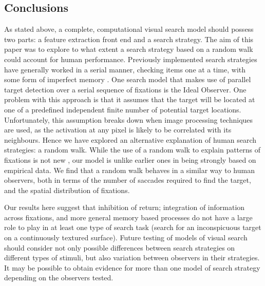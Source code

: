 \subsection{Conclusions}
As stated above, a complete, computational visual search model should possess two parts: a feature extraction front end and a search strategy. The aim of this paper was to explore to what extent a search strategy based on a random walk could account for human performance. Previously implemented search strategies have generally worked in a serial manner, checking items one at a time, with some form of imperfect memory \citep{melloy2006, rutishauser-koch2007}. One search model that makes use of parallel target detection over a serial sequence of fixations is the Ideal Observer. One problem with this approach is that it assumes that the target will be located at one of a predefined independent finite number of potential target locations. Unfortunately, this assumption breaks down when image processing techniques are used, as the activation at any pixel is likely to be correlated with its neighbours. Hence we have explored an alternative explanation of human search strategies: a random walk. While the use of a random walk to explain patterns of fixations is not new \citep{greene2008, aks2002, morawski1980}, our model is unlike earlier ones in being strongly based on empirical data. We find that a random walk behaves in a similar way to human observers, both in terms of the number of saccades required to find the target, and the spatial distribution of fixations. 
\par
Our results here suggest that inhibition of return; integration of information across fixations, and more general memory based processes do not have a large role to play in at least one type of search task (search for an inconspicuous target on a continuously textured surface). Future testing of models of visual search should consider not only possible differences between search strategies on different types of stimuli, but also variation between observers in their strategies. It may be possible to obtain evidence for more than one model of search strategy depending on the observers tested.
